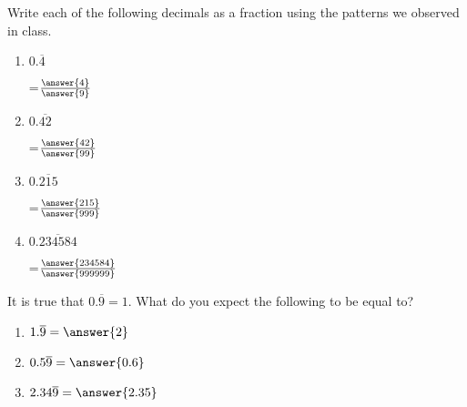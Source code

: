 \documentclass[nooutcomes]{ximera}
\begin{document}
\begin{problem}
Write each of the following decimals as a fraction using the patterns we observed in class.

\begin{enumerate}
	\item $0.\overline{4}$ \begin{prompt} =$\frac{\answer{4}}{\answer{9}}$ \end{prompt}
	\item $0.\overline{42}$ \begin{prompt} =$\frac{\answer{42}}{\answer{99}}$ \end{prompt}
	\item $0.\overline{215}$ \begin{prompt} =$\frac{\answer{215}}{\answer{999}}$ \end{prompt}
	\item $0.\overline{234584}$ \begin{prompt} =$\frac{\answer{234584}}{\answer{999999}}$ \end{prompt}
\end{enumerate}
\end{problem}





\begin{problem}
 It is true that $0.\overline{9} = 1$.  What do you expect the following to be equal to?
 
 \begin{enumerate}
 	\item $1.\overline{9} = \answer{2}$
	\item $0.5\overline{9} = \answer{0.6}$
	\item $2.34\overline{9} = \answer{2.35}$
 \end{enumerate}
\end{problem}
\end{document}
